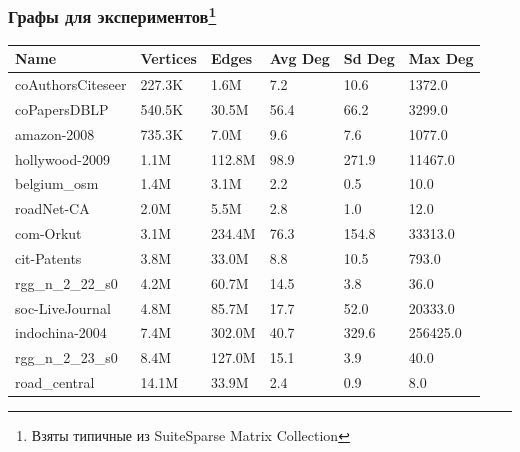 \documentclass[xcolor=table,aspectratio=169]{beamer}
\begin{document}
\begin{frame}[t]
  \frametitle{Графы для экспериментов\footnote{Взяты типичные из SuiteSparse Matrix Collection}}
  \begin{center}
    \begin{table}[]
      \begin{tabular}{l|l|l|l|l|l}
      Name              & Vertices & Edges  & Avg Deg & Sd Deg & Max Deg  \\
      \hline\hline
      \rowcolor{Gray}
      coAuthorsCiteseer & 227.3K   & 1.6M   & 7.2     & 10.6   & 1372.0   \\
      coPapersDBLP      & 540.5K   & 30.5M  & 56.4    & 66.2   & 3299.0   \\
      \rowcolor{Gray}
      amazon-2008       & 735.3K   & 7.0M   & 9.6     & 7.6    & 1077.0   \\
      hollywood-2009    & 1.1M     & 112.8M & 98.9    & 271.9  & 11467.0  \\
      \rowcolor{Gray}
      belgium\_osm      & 1.4M     & 3.1M   & 2.2     & 0.5    & 10.0     \\
      roadNet-CA        & 2.0M     & 5.5M   & 2.8     & 1.0    & 12.0     \\
      \rowcolor{Gray}
      com-Orkut         & 3.1M     & 234.4M & 76.3    & 154.8  & 33313.0  \\
      cit-Patents       & 3.8M     & 33.0M  & 8.8     & 10.5   & 793.0    \\
      \rowcolor{Gray}
      rgg\_n\_2\_22\_s0 & 4.2M     & 60.7M  & 14.5    & 3.8    & 36.0     \\
      soc-LiveJournal   & 4.8M     & 85.7M  & 17.7    & 52.0   & 20333.0  \\
      \rowcolor{Gray}
      indochina-2004    & 7.4M     & 302.0M & 40.7    & 329.6  & 256425.0 \\
      rgg\_n\_2\_23\_s0 & 8.4M     & 127.0M & 15.1    & 3.9    & 40.0     \\
      \rowcolor{Gray}
      road\_central     & 14.1M    & 33.9M  & 2.4     & 0.9    & 8.0     
      \end{tabular}
    \end{table}
  \end{center}
\end{frame}
\end{document}
